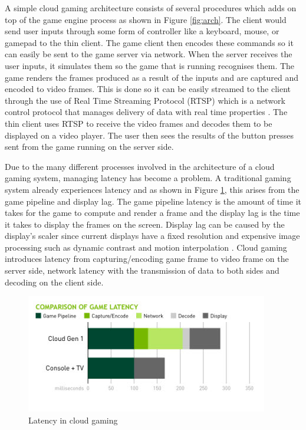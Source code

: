 A simple cloud gaming architecture consists of several procedures which adds on top of the game engine process as shown in Figure \ref{fig:arch}. The client would send user inputs through some form of controller like a keyboard, mouse, or gamepad to the thin client. The game client then encodes these commands so it can easily be sent to the game server via network. When the server receives the user inputs, it simulates them so the game that is running recognises them. The game renders the frames produced as a result of the inputs and are captured and encoded to video frames. This is done so it can be easily streamed to the client through the use of Real Time Streaming Protocol (RTSP) which is a network control protocol that manages delivery of data with real time properties \cite{rtsp}. The thin client uses RTSP to receive the video frames and decodes them to be displayed on a video player. The user then sees the results of the button presses sent from the game running on the server side.
\newline 
\par
Due to the many different processes involved in the architecture of a cloud gaming system, managing latency has become a problem. A traditional gaming system already experiences latency and as shown in Figure \ref{fig:latency}, this arises from the game pipeline and display lag. The game pipeline latency is the amount of time it takes for the game to compute and render a frame and the display lag is the time it takes to display the frames on the screen. Display lag can be caused by the display's scaler since current displays have a fixed resolution and expensive image processing such as dynamic contrast and motion interpolation \cite{displaylag}. Cloud gaming introduces latency from capturing/encoding game frame to video frame on the server side, network latency with the transmission of data to both sides and decoding on the client side.

\begin{figure}[h]
 \centering
 \includegraphics[width=0.8\linewidth]{images/latency.png}
 \caption{Latency in cloud gaming \cite{cloudlatency}}
 \label{fig:latency}
\end{figure}

